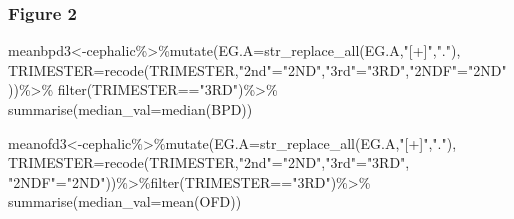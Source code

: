 \documentclass[
]{article}
\newenvironment{Shaded}{\begin{snugshade}}{\end{snugshade}}
\newcommand{\AttributeTok}[1]{\textcolor[rgb]{0.77,0.63,0.00}{#1}}
\newcommand{\FunctionTok}[1]{\textcolor[rgb]{0.00,0.00,0.00}{#1}}
\newcommand{\NormalTok}[1]{#1}
\newcommand{\OtherTok}[1]{\textcolor[rgb]{0.56,0.35,0.01}{#1}}
\newcommand{\SpecialCharTok}[1]{\textcolor[rgb]{0.00,0.00,0.00}{#1}}
\newcommand{\StringTok}[1]{\textcolor[rgb]{0.31,0.60,0.02}{#1}}
\begin{document}
\hypertarget{figure-2}{%
\subsubsection{\texorpdfstring{\textbf{Figure
2}}{Figure 2}}\label{figure-2}}

\begin{Shaded}
\begin{Highlighting}[]
\NormalTok{meanbpd3}\OtherTok{\textless{}{-}}\NormalTok{cephalic}\SpecialCharTok{\%\textgreater{}\%}\FunctionTok{mutate}\NormalTok{(}\AttributeTok{EG.A=}\FunctionTok{str\_replace\_all}\NormalTok{(EG.A,}\StringTok{"[+]"}\NormalTok{,}\StringTok{"."}\NormalTok{),}
  \AttributeTok{TRIMESTER=}\FunctionTok{recode}\NormalTok{(TRIMESTER,}\StringTok{"2nd"}\OtherTok{=}\StringTok{"2ND"}\NormalTok{,}\StringTok{"3rd"}\OtherTok{=}\StringTok{"3RD"}\NormalTok{,}\StringTok{"2NDF"}\OtherTok{=}\StringTok{"2ND"}\NormalTok{))}\SpecialCharTok{\%\textgreater{}\%}
  \FunctionTok{filter}\NormalTok{(TRIMESTER}\SpecialCharTok{==}\StringTok{"3RD"}\NormalTok{)}\SpecialCharTok{\%\textgreater{}\%}
  \FunctionTok{summarise}\NormalTok{(}\AttributeTok{median\_val=}\FunctionTok{median}\NormalTok{(BPD))}

\NormalTok{meanofd3}\OtherTok{\textless{}{-}}\NormalTok{cephalic}\SpecialCharTok{\%\textgreater{}\%}\FunctionTok{mutate}\NormalTok{(}\AttributeTok{EG.A=}\FunctionTok{str\_replace\_all}\NormalTok{(EG.A,}\StringTok{"[+]"}\NormalTok{,}\StringTok{"."}\NormalTok{),}
                        \AttributeTok{TRIMESTER=}\FunctionTok{recode}\NormalTok{(TRIMESTER,}\StringTok{"2nd"}\OtherTok{=}\StringTok{"2ND"}\NormalTok{,}\StringTok{"3rd"}\OtherTok{=}\StringTok{"3RD"}\NormalTok{,}
                        \StringTok{"2NDF"}\OtherTok{=}\StringTok{"2ND"}\NormalTok{))}\SpecialCharTok{\%\textgreater{}\%}\FunctionTok{filter}\NormalTok{(TRIMESTER}\SpecialCharTok{==}\StringTok{"3RD"}\NormalTok{)}\SpecialCharTok{\%\textgreater{}\%}
                         \FunctionTok{summarise}\NormalTok{(}\AttributeTok{median\_val=}\FunctionTok{mean}\NormalTok{(OFD))}



\end{Highlighting}
\end{Shaded}
\end{document}
